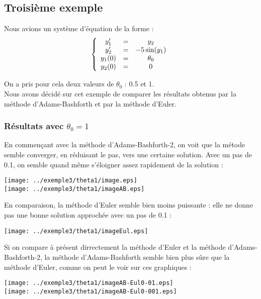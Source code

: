 \subsection{Troisième exemple}

Nous avions un système d'équation de la forme :
\[\left\{ \begin{array}{c c c}
y_1' &=& y_2\\
y_2' &=& -5\sin(y_1)\\
y_1(0) &=& \theta_0 \\
y_2(0) &=& 0
\end{array}\right.\]

On a pris pour cela deux valeurs de $\theta_0$ : 0.5 et 1.\\
Nous avons décidé sur cet exemple de comparer les résultats obtenus par la méthode d'Adams-Bashforth et par la méthode d'Euler. 

\subsubsection{Résultats avec $\theta_0=1$}
\bigskip
En commençant avec la méthode d'Adams-Bashforth-2, on voit que la métode semble converger, en réduisant le pas, vers une certaine solution. Avec un pas de 0.1, on semble quand même s'éloigner assez rapidement de la solution :
\begin{center}
\texttt{[image: ../exemple3/theta1/image.eps]}\\
\texttt{[image: ../exemple3/theta1/imageAB.eps]}
\end{center}

En comparaison, la méthode d'Euler semble bien moins puissante : elle ne donne pas une bonne solution approchée avec un pas de 0.1 :
\begin{center}
\texttt{[image: ../exemple3/theta1/imageEul.eps]}
\end{center}

Si on compare à présent dirrectement la méthode d'Euler et la méthode d'Adams-Bashforth-2, la méthode d'Adams-Bashforth semble bien plus sûre que la méthode d'Euler, comme on peut le voir sur ces graphiques :

\begin{center}
\texttt{[image: ../exemple3/theta1/imageAB-Eul0-01.eps]}\\
\texttt{[image: ../exemple3/theta1/imageAB-Eul0-001.eps]}
\end{center}

